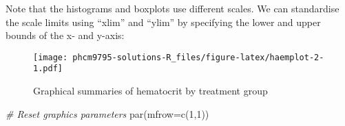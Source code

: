 \documentclass[
]{memoir}
\newenvironment{Shaded}{\begin{snugshade}}{\end{snugshade}}
\newcommand{\AttributeTok}[1]{\textcolor[rgb]{0.77,0.63,0.00}{#1}}
\newcommand{\CommentTok}[1]{\textcolor[rgb]{0.56,0.35,0.01}{\textit{#1}}}
\newcommand{\DecValTok}[1]{\textcolor[rgb]{0.00,0.00,0.81}{#1}}
\newcommand{\FunctionTok}[1]{\textcolor[rgb]{0.00,0.00,0.00}{#1}}
\newcommand{\NormalTok}[1]{#1}
\newcommand{\SpecialCharTok}[1]{\textcolor[rgb]{0.00,0.00,0.00}{#1}}
\newcommand{\StringTok}[1]{\textcolor[rgb]{0.31,0.60,0.02}{#1}}
\begin{document}
Note that the histograms and boxplots use different scales. We can standardise the scale limits using ``xlim'' and ``ylim'' by specifying the lower and upper bounds of the x- and y-axis:

\begin{Shaded}
\end{Shaded}

\begin{figure}
\centering
\texttt{[image: phcm9795-solutions-R\_files/figure-latex/haemplot-2-1.pdf]}
\caption{\label{fig:haemplot-2}Graphical summaries of hematocrit by treatment group}
\end{figure}

\begin{Shaded}
\begin{Highlighting}[]
\CommentTok{\# Reset graphics parameters}
\FunctionTok{par}\NormalTok{(}\AttributeTok{mfrow=}\FunctionTok{c}\NormalTok{(}\DecValTok{1}\NormalTok{,}\DecValTok{1}\NormalTok{))}
\end{Highlighting}
\end{Shaded}
\end{document}
